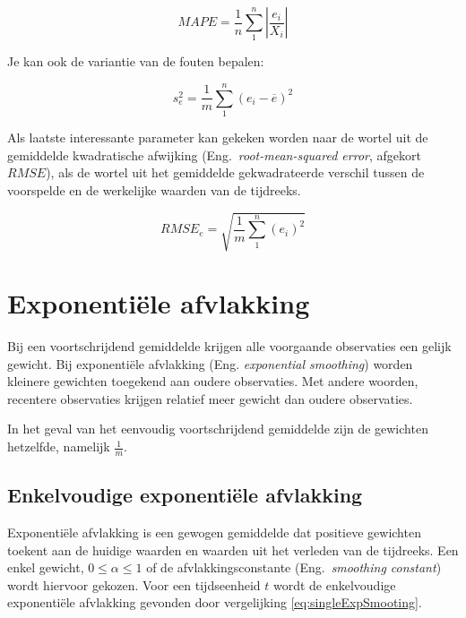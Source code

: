 \begin{definition}[$MAPE$]
\begin{equation}
	MAPE = \frac{1}{n} \sum_{1}^{n} \left| \frac{e_{i}}{X_i} \right|  
\label{eq:MAD2}
\end{equation}
\end{definition}

Je kan ook de variantie van de fouten bepalen:

\begin{definition}[$VAR$]
\begin{equation}
	s^{2}_{e} = \frac{1}{m} \sum_{1}^{n} (e_{i} - \overline{e})^{2}
\label{eq:varError}
\end{equation}
\end{definition}


Als laatste interessante parameter kan gekeken worden naar de wortel uit de gemiddelde kwadratische afwijking (Eng.~\emph{root-mean-squared error}, afgekort $RMSE$), als de wortel uit het gemiddelde gekwadrateerde verschil tussen de voorspelde en de werkelijke waarden van de tijdreeks.

\begin{definition}[$RMSE$]
\begin{equation}
	RMSE_{e} = \sqrt{\frac{1}{m} \sum_{1}^{n} (e_{i})^{2}}
\label{eq:varError2}
\end{equation}
\end{definition}

\section{Exponentiële afvlakking}

Bij een voortschrijdend gemiddelde krijgen alle voorgaande observaties een gelijk gewicht. Bij exponentiële afvlakking (Eng. \emph{exponential smoothing}) worden kleinere gewichten toegekend aan oudere observaties. Met andere woorden, recentere observaties krijgen relatief meer gewicht dan oudere observaties.

In het geval van het eenvoudig voortschrijdend gemiddelde zijn de gewichten hetzelfde, namelijk $\frac{1}{m}$.

\subsection{Enkelvoudige exponentiële afvlakking}

Exponentiële afvlakking is een gewogen gemiddelde dat positieve gewichten toekent aan de huidige waarden en waarden uit het verleden van de tijdreeks. Een enkel gewicht, $0\leq \alpha \leq1$ of de afvlakkingsconstante (Eng.~\emph{smoothing constant}) wordt hiervoor gekozen. Voor een tijdseenheid $t$ wordt de enkelvoudige exponentiële afvlakking gevonden door vergelijking \ref{eq:singleExpSmooting}.

